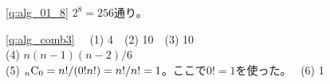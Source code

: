 \ref{q:alg_01_8} $2^8=256$通り。
\mv



\ref{q:alg_comb3}　
(1) 4　(2) 10　(3) 10\\
(4) $n(n-1)(n-2)/6$\\
(5) $_{n}{\text C}_{0}=n!/(0!n!)=n!/n!=1$。ここで$0!=1$を使った。　
(6) 1
\mv

